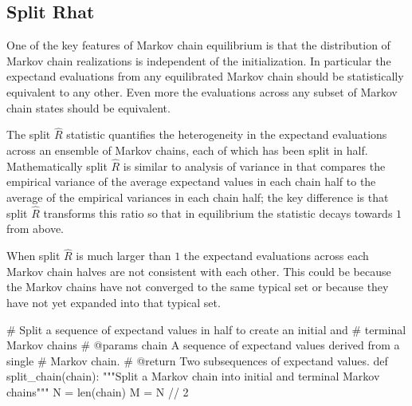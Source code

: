 \documentclass[
  letterpaper,
  DIV=11,
  numbers=noendperiod]{scrartcl}
\newenvironment{Shaded}{\begin{snugshade}}{\end{snugshade}}
\newcommand{\BuiltInTok}[1]{\textcolor[rgb]{0.00,0.23,0.31}{#1}}
\newcommand{\CommentTok}[1]{\textcolor[rgb]{0.37,0.37,0.37}{#1}}
\newcommand{\DecValTok}[1]{\textcolor[rgb]{0.68,0.00,0.00}{#1}}
\newcommand{\KeywordTok}[1]{\textcolor[rgb]{0.00,0.23,0.31}{#1}}
\newcommand{\NormalTok}[1]{\textcolor[rgb]{0.00,0.23,0.31}{#1}}
\newcommand{\OperatorTok}[1]{\textcolor[rgb]{0.37,0.37,0.37}{#1}}
\begin{document}
\hypertarget{split-rhat}{%
\subsection{Split Rhat}\label{split-rhat}}

One of the key features of Markov chain equilibrium is that the
distribution of Markov chain realizations is independent of the
initialization. In particular the expectand evaluations from any
equilibrated Markov chain should be statistically equivalent to any
other. Even more the evaluations across any subset of Markov chain
states should be equivalent.

The split \(\hat{R}\) statistic quantifies the heterogeneity in the
expectand evaluations across an ensemble of Markov chains, each of which
has been split in half. Mathematically split \(\hat{R}\) is similar to
analysis of variance in that compares the empirical variance of the
average expectand values in each chain half to the average of the
empirical variances in each chain half; the key difference is that split
\(\hat{R}\) transforms this ratio so that in equilibrium the statistic
decays towards \(1\) from above.

When split \(\hat{R}\) is much larger than \(1\) the expectand
evaluations across each Markov chain halves are not consistent with each
other. This could be because the Markov chains have not converged to the
same typical set or because they have not yet expanded into that typical
set.

\begin{Shaded}
\begin{Highlighting}[]

\CommentTok{\# Split a sequence of expectand values in half to create an initial and }
\CommentTok{\# terminal Markov chains}
\CommentTok{\# @params chain A sequence of expectand values derived from a single }
\CommentTok{\#               Markov chain.}
\CommentTok{\# @return Two subsequences of expectand values.}
\KeywordTok{def}\NormalTok{ split\_chain(chain):}
  \CommentTok{"""Split a Markov chain into initial and terminal Markov chains"""}
\NormalTok{  N }\OperatorTok{=} \BuiltInTok{len}\NormalTok{(chain)}
\NormalTok{  M }\OperatorTok{=}\NormalTok{ N }\OperatorTok{//} \DecValTok{2}
\end{Highlighting}
\end{Shaded}
\end{document}
